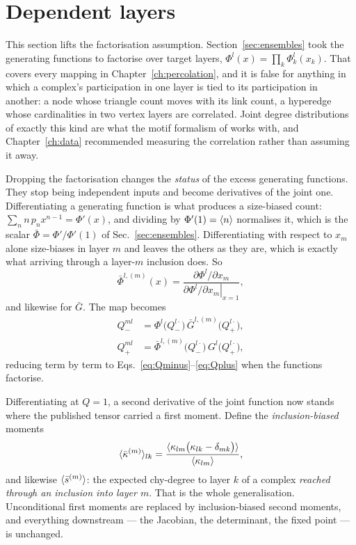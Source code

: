 \section{Dependent layers}
\label{sec:joint}

This section lifts the factorisation assumption.
Section~\ref{sec:ensembles} took the generating functions to factorise over
target layers, $\Phi^{l}(x)=\prod_{k}\Phi^{l}_{k}(x_{k})$. That
covers every mapping in Chapter~\ref{ch:percolation}, and it is false for
anything in which a complex's participation in one layer is tied to its
participation in another: a node whose triangle count moves with its link count,
a hyperedge whose cardinalities in two vertex layers are correlated. Joint
degree distributions of exactly this kind are what the motif formalism of
\citet{mann2021} works with, and Chapter~\ref{ch:data} recommended
measuring the correlation rather than assuming it away.

Dropping the factorisation changes the \emph{status} of the excess generating
functions. They stop being independent inputs and become derivatives of the
joint one. Differentiating a generating function is what produces a size-biased
count: $\sum_{n}n\,p_{n}x^{n-1}=\Phi'(x)$, and dividing by $\Phi'(1)=\langle n \rangle$
normalises it, which is the scalar $\bar\Phi=\Phi'/\Phi'(1)$ of
Sec.~\ref{sec:ensembles}. Differentiating with respect to $x_{m}$ alone
size-biases in layer $m$ and leaves the others as they are, which is exactly
what arriving through a layer-$m$ inclusion does. So
\begin{equation}
  \bar\Phi^{l,(m)}(x)=\frac{\partial\Phi^{l}/\partial x_{m}}
    {\left.\partial\Phi^{l}/\partial x_{m}\right|_{x=1}},
  \label{eq:excessderived}
\end{equation}
and likewise for $\bar G$. The map becomes
\begin{align}
  Q^{ml}_{-}&=\Phi^{l}\bigl(Q^{l\cdot}_{-}\bigr)\,
              \bar G^{l,(m)}\bigl(Q^{l\cdot}_{+}\bigr),\nonumber\\
  Q^{ml}_{+}&=\bar\Phi^{l,(m)}\bigl(Q^{l\cdot}_{-}\bigr)\,
              G^{l}\bigl(Q^{l\cdot}_{+}\bigr),
  \label{eq:jointmap}
\end{align}
reducing term by term to Eqs.~\eqref{eq:Qminus}--\eqref{eq:Qplus} when the
functions factorise.

Differentiating at $Q=1$, a second derivative of the joint function now stands
where the published tensor carried a first moment. Define the
\emph{inclusion-biased} moments
\begin{equation}
  \langle \bar\kappa^{(m)} \rangle_{lk}
   =\frac{\langle \kappa_{lm}\bigl(\kappa_{lk}-\delta_{mk}\bigr) \rangle}
         {\langle \kappa_{lm} \rangle},
  \label{eq:biased}
\end{equation}
and likewise $\langle \bar s^{(m)} \rangle$: the expected chy-degree to layer $k$ of a
complex \emph{reached through an inclusion into layer $m$}. That is the whole
generalisation. Unconditional first moments are replaced by inclusion-biased
second moments, and everything downstream --- the Jacobian, the determinant, the
fixed point --- is unchanged.

